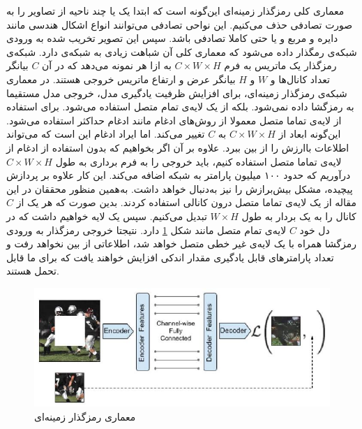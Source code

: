 معماری کلی رمزگذار زمینه‌ای این‌گونه است که ابتدا یک یا چند ناحیه از تصاویر را به صورت تصادفی حذف می‌کنیم. این نواحی تصادفی می‌توانند انواع اشکال هندسی مانند دایره و مربع و یا حتی کاملا تصادفی باشد. سپس این تصویر تخریب شده به ورودی شبکه‌ی رمگذار داده می‌شود که معماری کلی آن شباهت زیادی به شبکه‌ی
دارد. شبکه‌ی رمزگذار یک ماتریس به فرم
$C \times W \times H$
به ازا هر نمونه می‌دهد که در آن $C$ بیانگر تعداد کانال‌ها و $W$ و $H$ بیانگر عرض و ارتفاع ماتریس خروجی هستند. در معماری شبکه‌ی رمزگذار زمینه‌ای، برای افزایش ظرفیت یادگیری مدل، خروجی مدل مستقیما به رمزگشا داده نمی‌شود. بلکه از یک لایه‌ی تمام متصل استفاده می‌شود. برای استفاده از لایه‌ی تماما متصل معمولا از
روش‌های ادغام
مانند ادغام حداکثر استفاده می‌شود. این‌گونه ابعاد از
$C \times W \times H$
به $C$ تغییر می‌کند.
اما ایراد ادغام این است که می‌تواند اطلاعات باارزش را از بین ببرد. علاوه بر آن اگر بخواهیم که بدون استفاده از ادغام از لایه‌ی تماما متصل استفاده کنیم، باید خروجی را به فرم برداری به طول
$C \times W \times H$
درآوریم که حدود ۱۰۰ میلیون پارامتر به شبکه اضافه می‌کند. این کار علاوه بر پردازش پیچیده، مشکل بیش‌برازش را نیز به‌دنبال خواهد داشت. به‌همین منظور محققان در این مقاله از یک لایه‌ی
تماما متصل درون کانالی
استفاده کردند. بدین صورت که هر یک از
$C$
کانال را به یک بردار به طول
$W \times H$
تبدیل می‌کنیم. سپس یک لایه خواهیم داشت که در دل خود
$C$
لایه‌ی تمام متصل مانند شکل \ref{fig:inpainting-architecture} دارد.
نتیجتا خروجی رمزگذار به ورودی رمزگشا همراه با یک لایه‌ی غیر خطی متصل خواهد شد، اطلاعاتی از بین نخواهد رفت و تعداد پارامترهای قابل یادگیری مقدار اندکی افزایش خواهند یافت که برای ما قابل تحمل هستند.

\begin{figure}[htb!]
\centering
\includegraphics[width=1.0\textwidth]{Images/Chapter2/inpainting-architecture.png}
\caption{معماری رمزگذار زمینه‌ای}
\label{fig:inpainting-architecture}
\end{figure}

